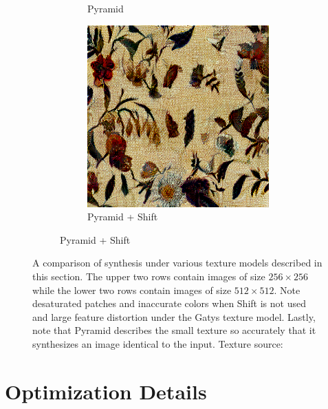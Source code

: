 \begin{figure}[ht]
\begin{subfigure}{0.8\textwidth}
\begin{subfigure}{0.32\textwidth}
            \caption{Pyramid}
            \label{fig:methods_comparison_large-pyramid}
        \end{subfigure}
        \hfill
        \begin{subfigure}{0.32\textwidth}
            \centering
            \includegraphics[width=\textwidth]{images/03-comparison_large_pyramid_shift.jpg}
            \caption{Pyramid + Shift}
            \label{fig:methods_comparison_large-pyramid_shift}
        \end{subfigure}
    \end{subfigure}
    \caption{A comparison of synthesis under various texture models described in this section. The upper two rows contain images of size \(256 \times 256\) while the lower two rows contain images of size \(512 \times 512\). Note desaturated patches and inaccurate colors when Shift is not used and large feature distortion under the Gatys texture model. Lastly, note that Pyramid describes the small texture so accurately that it synthesizes an image identical to the input. Texture source: \citet{Pixar128}}
    \label{fig:methods_comparison_small}
\end{figure}

\section{Optimization Details}
\label{section:methods-optimization}


